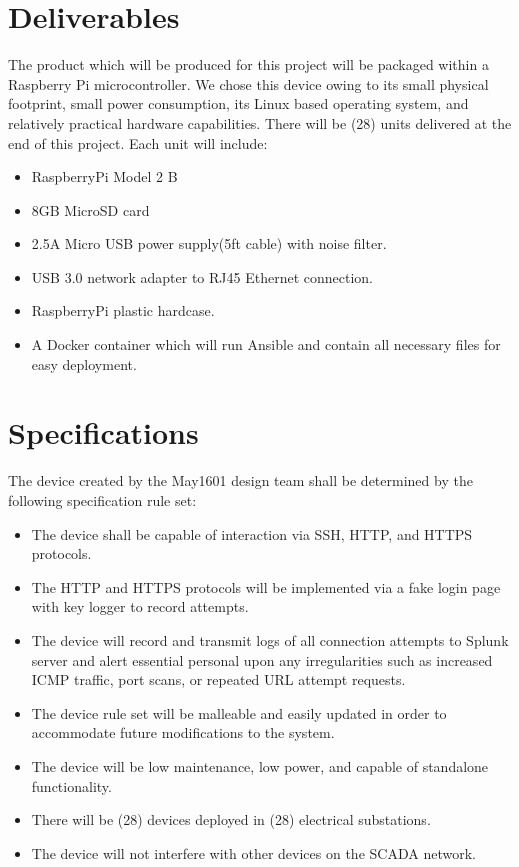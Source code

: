 \section{Deliverables}

The product which will be produced for this project will be packaged within a Raspberry Pi microcontroller. We chose this device owing to its small physical footprint, small power consumption, its Linux based operating system, and relatively practical hardware capabilities. There will be (28) units delivered at the end of this project. Each unit will include:

\begin{itemize} 
\item RaspberryPi Model 2 B
\item 8GB MicroSD card
\item 2.5A Micro USB power supply(5ft cable) with noise filter.
\item USB 3.0 network adapter to RJ45 Ethernet connection.
\item RaspberryPi plastic hardcase.
\item A Docker container which will run Ansible and contain all necessary files for easy deployment.
\end{itemize}

\section{Specifications}

The device created by the May1601 design team shall be determined by the following specification rule set:

\begin{itemize} 
\item The device shall be capable of interaction via SSH, HTTP, and HTTPS protocols.
\item The HTTP and HTTPS protocols will be implemented via a fake login page with key logger to record attempts.
\item The device will record and transmit logs of all connection attempts to Splunk server and alert essential personal upon any irregularities such as increased ICMP traffic, port scans, or repeated URL attempt requests. 
\item The device rule set will be malleable and easily updated in order to accommodate future modifications to the system.
\item The device will be low maintenance, low power, and capable of standalone functionality. 
\item There will be (28) devices deployed in (28) electrical substations. 
\item The device will not interfere with other devices on the SCADA network.
\end{itemize}
